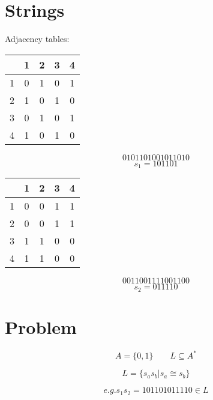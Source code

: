 \documentclass[a4paper]{IEEEtran}
\begin{document}
\section{Strings}
    \vspace{2mm}
    Adjacency tables:
    \begin{center}
        \begin{minipage}{0.45\columnwidth}
        \centering
        \begin{tabular}{ c|cccc } 
              & 1 & 2 & 3 & 4 \\
            \hline
            1 & 0 & 1 & 0 & 1 \\ 
            2 & 1 & 0 & 1 & 0 \\ 
            3 & 0 & 1 & 0 & 1 \\ 
            4 & 1 & 0 & 1 & 0 \\ 
        \end{tabular}
        \vspace{2mm}
        \[0101 1010 0101 1010\]
        \[s_1 = 101 10 1 \]
        \end{minipage}
        \begin{minipage}{0.45\columnwidth}
        \begin{tabular}{ c|cccc } 
               & 1 & 2 & 3 & 4 \\
             \hline
             1 & 0 & 0 & 1 & 1 \\ 
             2 & 0 & 0 & 1 & 1 \\ 
             3 & 1 & 1 & 0 & 0 \\ 
             4 & 1 & 1 & 0 & 0 \\ 
        \end{tabular}
        \vspace{2mm}
        \[0011 0011 1100 1100\]
        \[s_2 = 011 11 0 \]
        \end{minipage}
    \end{center}
    \vspace{4mm}

\section{Problem}

    \[A = \{0,1\} \qquad L \subseteq A^*\]
    
    \[L = \{ s_as_b | s_a \cong s_b \} \]
    
    \[ e.g. s_1 s_2 = 101 10 1 011 11 0 \in L \]
\end{document}
